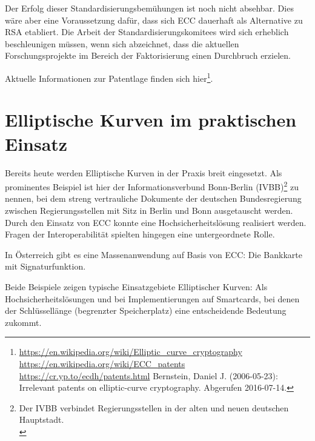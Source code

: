 \begin{refsegment}
Der Erfolg dieser Standardisierungsbemühungen ist noch nicht absehbar.
Dies wäre aber eine Voraussetzung dafür, dass sich ECC dauerhaft als
Alternative zu RSA etabliert. Die Arbeit der Standardisierungskomitees wird
sich erheblich beschleunigen müssen, wenn sich abzeichnet, dass die aktuellen
Forschungsprojekte im Bereich der Faktorisierung einen Durchbruch erzielen.

Aktuelle Informationen zur Patentlage finden sich hier\footnote{%
\url{https://en.wikipedia.org/wiki/Elliptic_curve_cryptography}\\
\url{https://en.wikipedia.org/wiki/ECC_patents}\\
\url{https://cr.yp.to/ecdh/patents.html} Bernstein, Daniel J. (2006-05-23):
\glqq Irrelevant patents on elliptic-curve cryptography\grqq. Abgerufen 2016-07-14.
}.


\section{Elliptische Kurven im praktischen Einsatz}

Bereits heute werden Elliptische Kurven in der Praxis breit eingesetzt.
Als prominentes Beispiel ist hier der Informationsverbund Bonn-Berlin (IVBB)\footnote{%
Der IVBB verbindet Regierungsstellen in der alten und neuen deutschen Hauptstadt.\\
} zu nennen, bei dem
streng vertrauliche Dokumente der deutschen Bundesregierung zwischen Regierungsstellen
mit Sitz in Berlin und Bonn ausgetauscht werden. Durch den Einsatz von ECC konnte eine
Hochsicherheitslösung realisiert werden. Fragen der Interoperabilität spielten
hingegen eine untergeordnete Rolle.

In Österreich gibt es eine Massenanwendung auf Basis von ECC: Die Bankkarte mit Signaturfunktion.

Beide Beispiele zeigen typische Einsatzgebiete Elliptischer Kurven:
Als Hochsicherheitslösungen und bei Implementierungen auf Smartcards, bei denen
der Schlüssellänge (begrenzter Speicherplatz) eine entscheidende Bedeutung zukommt.



\printbibliography[%
	heading=subbibintoc,
	title={Literatur zu Kapitel \thechapter},
	segment=\therefsegment,
]



\end{refsegment}
